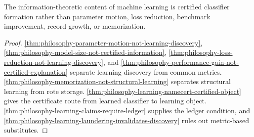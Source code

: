 \begin{theorem}
\label{thm:philosophy-classifier-forming-learning-theorem}
The information-theoretic content of machine learning is certified
classifier formation rather than parameter motion, loss reduction,
benchmark improvement, record growth, or memorization.
\end{theorem}
\begin{proof}
\autoref{thm:philosophy-parameter-motion-not-learning-discovery},
\autoref{thm:philosophy-model-size-not-certified-information},
\autoref{thm:philosophy-loss-reduction-not-learning-discovery}, and
\autoref{thm:philosophy-performance-gain-not-certified-explanation}
separate learning discovery from common metrics.
\autoref{thm:philosophy-memorization-not-structural-learning} separates
structural learning from rote storage.
\autoref{thm:philosophy-learning-namecert-certified-object} gives the
certificate route from learned classifier to learning object.
\autoref{thm:philosophy-learning-claims-require-ledger} supplies the
ledger condition, and
\autoref{thm:philosophy-learning-laundering-invalidates-discovery}
rules out metric-based substitutes.
\end{proof}

